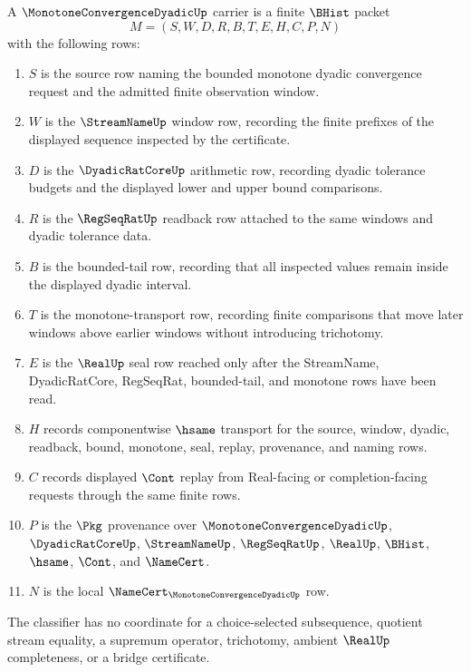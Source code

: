 \begin{definition}
\label{def:monotone-convergence-dyadic-carrier}
A $\MonotoneConvergenceDyadicUp$ carrier is a finite $\BHist$ packet
$$
M=(S,W,D,R,B,T,E,H,C,P,N)
$$
with the following rows:
\begin{enumerate}
\item $S$ is the source row naming the bounded monotone dyadic convergence request and the admitted finite observation window.
\item $W$ is the $\StreamNameUp$ window row, recording the finite prefixes of the displayed sequence inspected by the certificate.
\item $D$ is the $\DyadicRatCoreUp$ arithmetic row, recording dyadic tolerance budgets and the displayed lower and upper bound comparisons.
\item $R$ is the $\RegSeqRatUp$ readback row attached to the same windows and dyadic tolerance data.
\item $B$ is the bounded-tail row, recording that all inspected values remain inside the displayed dyadic interval.
\item $T$ is the monotone-transport row, recording finite comparisons that move later windows above earlier windows without introducing trichotomy.
\item $E$ is the $\RealUp$ seal row reached only after the StreamName, DyadicRatCore, RegSeqRat, bounded-tail, and monotone rows have been read.
\item $H$ records componentwise $\hsame$ transport for the source, window, dyadic, readback, bound, monotone, seal, replay, provenance, and naming rows.
\item $C$ records displayed $\Cont$ replay from Real-facing or completion-facing requests through the same finite rows.
\item $P$ is the $\Pkg$ provenance over $\MonotoneConvergenceDyadicUp$, $\DyadicRatCoreUp$, $\StreamNameUp$, $\RegSeqRatUp$, $\RealUp$, $\BHist$, $\hsame$, $\Cont$, and $\NameCert$.
\item $N$ is the local $\NameCert_{\MonotoneConvergenceDyadicUp}$ row.
\end{enumerate}
The classifier has no coordinate for a choice-selected subsequence, quotient stream equality, a supremum operator, trichotomy, ambient $\RealUp$ completeness, or a bridge certificate.
\end{definition}

